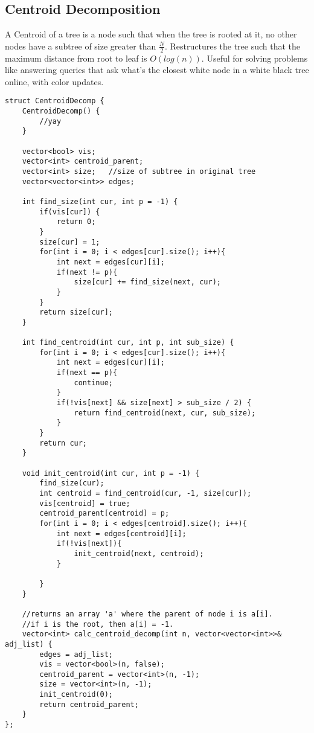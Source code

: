 \documentclass[8pt, headheight=10pt, a4paper]{article}
\begin{document}
\begin{multicols*}{3}
\subsection{Centroid Decomposition}
A Centroid of a tree is a node such that when the tree is rooted at it, no other nodes have a subtree of size greater than $\frac{N}{2}$. 
Restructures the tree such that the maximum distance from root to leaf is $O(log(n))$. Useful for solving problems like answering queries that ask what's the closest white node in a white black tree online, with color updates. 
\begin{lstlisting}
struct CentroidDecomp {
    CentroidDecomp() {
        //yay
    }

    vector<bool> vis;
    vector<int> centroid_parent;
    vector<int> size;   //size of subtree in original tree
    vector<vector<int>> edges;

    int find_size(int cur, int p = -1) {
        if(vis[cur]) {
            return 0;
        }
        size[cur] = 1;
        for(int i = 0; i < edges[cur].size(); i++){
            int next = edges[cur][i];
            if(next != p){
                size[cur] += find_size(next, cur);
            }
        }
        return size[cur];
    }

    int find_centroid(int cur, int p, int sub_size) {
        for(int i = 0; i < edges[cur].size(); i++){
            int next = edges[cur][i];
            if(next == p){
                continue;
            }
            if(!vis[next] && size[next] > sub_size / 2) {
                return find_centroid(next, cur, sub_size);
            }
        }
        return cur;
    }

    void init_centroid(int cur, int p = -1) {
        find_size(cur);
        int centroid = find_centroid(cur, -1, size[cur]);
        vis[centroid] = true;
        centroid_parent[centroid] = p;
        for(int i = 0; i < edges[centroid].size(); i++){
            int next = edges[centroid][i];
            if(!vis[next]){
                init_centroid(next, centroid);
            }
            
        }
    }

    //returns an array 'a' where the parent of node i is a[i]. 
    //if i is the root, then a[i] = -1. 
    vector<int> calc_centroid_decomp(int n, vector<vector<int>>& adj_list) {
        edges = adj_list;
        vis = vector<bool>(n, false);
        centroid_parent = vector<int>(n, -1);
        size = vector<int>(n, -1);
        init_centroid(0);
        return centroid_parent;
    }
};
\end{lstlisting}


\end{multicols*}
\end{document}
